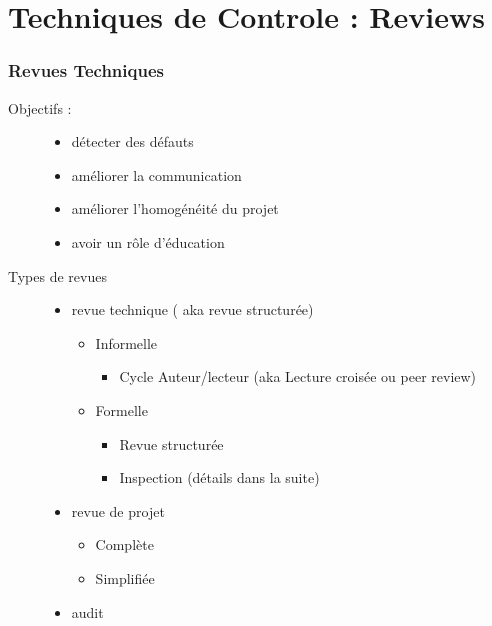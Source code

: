 \part{Techniques de Controle : Reviews}

\section{Revues Techniques}

\begin{description}
\item[Objectifs :]
	\begin{itemize}
	\item détecter des défauts
	\item améliorer la communication
	\item améliorer l'homogénéité du projet
	\item avoir un rôle d'éducation
	\end{itemize}

\item[Types de revues]
	\begin{itemize}

	\item revue technique ( aka revue structurée)
		\begin{itemize}

		\item Informelle
			\begin{itemize}

			\item Cycle Auteur/lecteur (aka Lecture croisée ou peer review)
			\end{itemize}

		\item Formelle
			\begin{itemize}

				\item Revue structurée
				\item Inspection (détails dans la suite)

			\end{itemize}
		\end{itemize}

	\item revue de projet
		\begin{itemize}

		\item Complète
		\item Simplifiée

		\end{itemize}

	\item audit

	\end{itemize}

\end{description}


